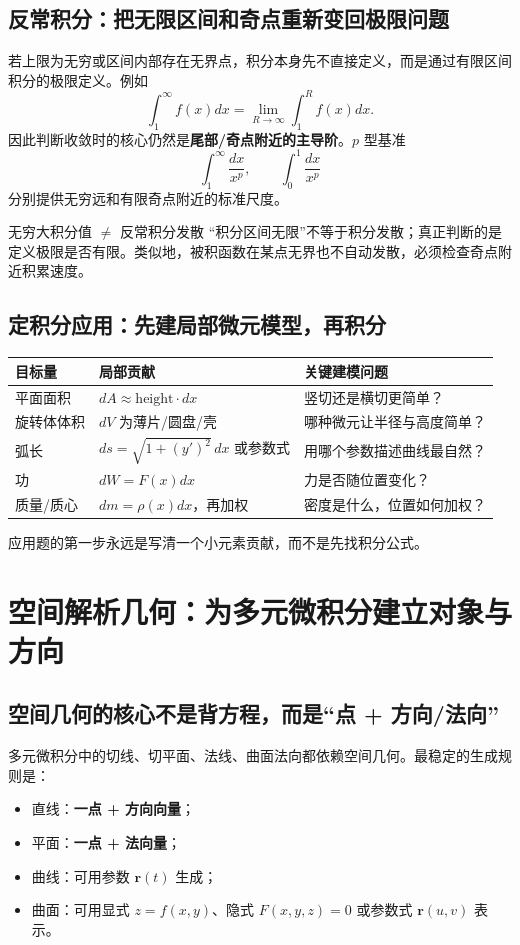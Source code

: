 \documentclass[11pt,a4paper,openany]{ctexbook}
\newcommand{\key}[1]{\textbf{\color{deep}#1}}
\begin{document}
\section{反常积分：把无限区间和奇点重新变回极限问题}
若上限为无穷或区间内部存在无界点，积分本身先不直接定义，而是通过有限区间积分的极限定义。例如
\[
\int_1^{\infty}f(x)dx=\lim_{R\to\infty}\int_1^R f(x)dx.
\]
因此判断收敛时的核心仍然是\key{尾部/奇点附近的主导阶}。$p$ 型基准
\[
\int_1^\infty \frac{dx}{x^p},\qquad \int_0^1\frac{dx}{x^p}
\]
分别提供无穷远和有限奇点附近的标准尺度。

\begin{boundarybox}{无穷大积分值 $\neq$ 反常积分发散}
“积分区间无限”不等于积分发散；真正判断的是定义极限是否有限。类似地，被积函数在某点无界也不自动发散，必须检查奇点附近积累速度。
\end{boundarybox}

\section{定积分应用：先建局部微元模型，再积分}
\begin{longtable}{L{3.1cm}L{5.4cm}L{\dimexpr\linewidth-8.67cm\relax}}
\toprule
\textbf{目标量} & \textbf{局部贡献} & \textbf{关键建模问题}\\
\midrule
平面面积 & $dA\approx \text{height}\cdot dx$ & 竖切还是横切更简单？\\
旋转体体积 & $dV$ 为薄片/圆盘/壳 & 哪种微元让半径与高度简单？\\
弧长 & $ds=\sqrt{1+(y')^2}\,dx$ 或参数式 & 用哪个参数描述曲线最自然？\\
功 & $dW=F(x)dx$ & 力是否随位置变化？\\
质量/质心 & $dm=\rho(x)dx$，再加权 & 密度是什么，位置如何加权？\\
\bottomrule
\end{longtable}
应用题的第一步永远是写清一个小元素贡献，而不是先找积分公式。

\chapter{空间解析几何：为多元微积分建立对象与方向}

\section{空间几何的核心不是背方程，而是“点 + 方向/法向”}
多元微积分中的切线、切平面、法线、曲面法向都依赖空间几何。最稳定的生成规则是：
\begin{itemize}
  \item 直线：\key{一点 + 方向向量}；
  \item 平面：\key{一点 + 法向量}；
  \item 曲线：可用参数 $\bm r(t)$ 生成；
  \item 曲面：可用显式 $z=f(x,y)$、隐式 $F(x,y,z)=0$ 或参数式 $\bm r(u,v)$ 表示。
\end{itemize}
\end{document}
